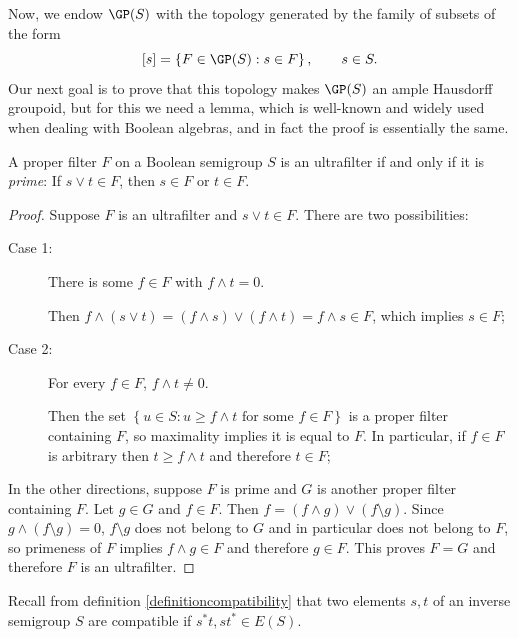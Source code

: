 Now, we endow $\GP(S)$ with the topology generated by the family of subsets of the form
\[[s]=\left\{F\in\GP(S):s\in F\right\},\qquad s\in S.\]
Our next goal is to prove that this topology makes $\GP(S)$ an ample Hausdorff groupoid, but for this we need a lemma, which is well-known and widely used when dealing with Boolean algebras, and in fact the proof is essentially the same.

\begin{lemma}\label{lemmaultrafilterprime}
A proper filter $F$ on a Boolean semigroup $S$ is an ultrafilter if and only if it is \emph{prime}: If $s\lor t\in F$, then $s\in F$ or $t\in F$.
\end{lemma}
\begin{proof}
Suppose $F$ is an ultrafilter and $s\lor t\in F$. There are two possibilities:
\begin{description}
\item[Case 1:] There is some $f\in F$ with $f\land t=0$.

Then $f\land(s\lor t)=(f\land s)\lor(f\land t)=f\land s\in F$, which implies $s\in F$;

\item[Case 2:] For every $f\in F$, $f\land t\neq 0$.

Then the set $\left\{u\in S:u\geq f\land t\text{ for some }f\in F\right\}$ is a proper filter containing $F$, so maximality implies it is equal to $F$. In particular, if $f\in F$ is arbitrary then $t\geq f\land t$ and therefore $t\in F$;
\end{description}

In the other directions, suppose $F$ is prime and $G$ is another proper filter containing $F$. Let $g\in G$ and $f\in F$. Then $f=(f\land g)\lor(f\setminus g)$. Since $g\land(f\setminus g)=0$, $f\setminus g$ does not belong to $G$ and in particular does not belong to $F$, so primeness of $F$ implies $f\land g\in F$ and therefore $g\in F$. This proves $F=G$ and therefore $F$ is an ultrafilter.\qedhere
\end{proof}

Recall from definition \ref{definitioncompatibility} that two elements $s,t$ of an inverse semigroup $S$ are compatible if $s^*t,st^*\in E(S)$.

